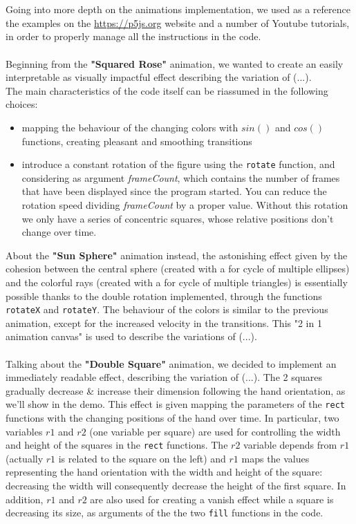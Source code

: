 \documentclass[a4paper,12pt]{report}
\begin{document}
\chapter{}

Going into more depth on the animations implementation, we used as a reference the examples on the \url{https://p5js.org}
website and a number of Youtube tutorials, in order to properly manage all the instructions in the code.\\
\\Beginning from the \textbf{"Squared Rose"} animation, we wanted to create an easily interpretable as visually impactful effect describing the variation of (...). \\The main characteristics of the code itself can be riassumed in the following choices:\begin{itemize}
\item mapping the behaviour of the changing colors with $sin()$ and $cos()$ functions, creating pleasant and smoothing transitions
\item introduce a constant rotation of the figure using the \texttt{rotate} function, and considering as argument \textit{frameCount}, which contains the number of frames that have been displayed since the program started. You can reduce the rotation speed dividing \textit{frameCount} by a proper value. Without this rotation we only have a series of concentric squares, whose relative positions don't change over time.
\end{itemize}
About the \textbf{"Sun Sphere"} animation instead, the astonishing effect given by the cohesion between the central sphere (created with a for cycle of multiple ellipses) and the colorful rays (created with a for cycle of multiple triangles) is essentially possible thanks to the double rotation implemented, through the functions \texttt{rotateX} and \texttt{rotateY}.
The behaviour of the colors is similar to the previous animation, except for the increased velocity in the transitions. This "2 in 1 animation canvas" is used to describe the variations of (...).\\
\\Talking about the \textbf{"Double Square"} animation, we decided to implement an immediately readable effect, describing the variation of (...). The 2 squares gradually decrease \& increase their dimension following the hand orientation, as we'll show in the demo. This effect is given mapping the parameters of the \texttt{rect} functions with the changing positions of the hand over time. In particular, two variables $r1$ and $r2$ (one variable per square) are used for controlling the width and height of the squares in the \texttt{rect} functions. The $r2$ variable depends from $r1$ (actually $r1$ is related to the square on the left) and $r1$ maps the values representing the hand orientation with the width and height of the square: decreasing the width will consequently decrease the height of the first square. In addition, $r1$ and $r2$ are also used for creating a vanish effect while a square is decreasing its size, as arguments of the the two \texttt{fill} functions in the code.
\end{document}
